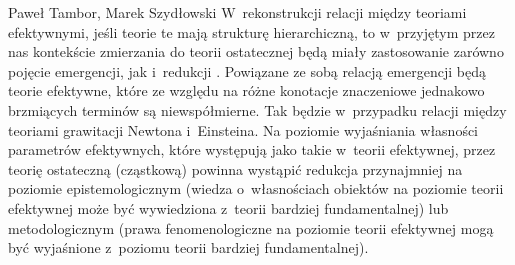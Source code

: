 \begin{artplenv}{Paweł Tambor, Marek Szydłowski}
W~rekonstrukcji relacji między teoriami efektywnymi, jeśli teorie te mają strukturę hierarchiczną, to w~przyjętym przez nas kontekście zmierzania do teorii ostatecznej będą miały zastosowanie zarówno pojęcie emergencji, jak i~redukcji
\parencites[][]{butterfield_reduction_2014}[][]{castellani_reductionism_2002}[][]{bain_emergence_2013}. %
 Powiązane ze sobą relacją emergencji będą teorie efektywne, które ze względu na różne konotacje znaczeniowe jednakowo brzmiących terminów są niewspółmierne. Tak będzie w~przypadku relacji między teoriami grawitacji Newtona i~Einsteina. Na poziomie wyjaśniania własności parametrów efektywnych, które występują jako takie w~teorii efektywnej, przez teorię ostateczną (cząstkową) powinna wystąpić redukcja przynajmniej na poziomie epistemologicznym (wiedza o~własnościach obiektów na poziomie teorii efektywnej może być wywiedziona z~teorii bardziej fundamentalnej) lub metodologicznym (prawa fenomenologiczne na poziomie teorii efektywnej mogą być wyjaśnione z~poziomu teorii bardziej fundamentalnej).


\end{artplenv}
